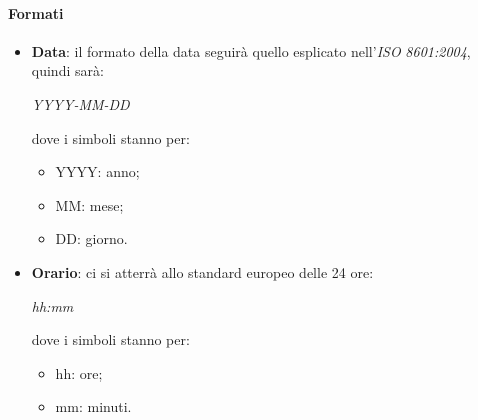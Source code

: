 	\paragraph{Formati}
	\begin{itemize}
	\item \textbf{Data}: il formato della data seguirà quello esplicato nell'\emph{ISO} \emph{8601:2004}, quindi sarà: 
		\begin{center}
			\emph{YYYY-MM-DD}
		\end{center}
	dove i simboli stanno per:
		\begin{itemize}
			\item YYYY: anno;
			\item MM: mese;
			\item DD: giorno.
		\end{itemize}
	\item \textbf{Orario}: ci si atterrà allo standard europeo delle 24 ore:
		 \begin{center}
		 	\emph{hh:mm}
		 \end{center}
	dove i simboli stanno per:
	 	\begin{itemize}
	 		\item hh: ore;
	 		\item mm: minuti.
	 	\end{itemize}
 	\begin{comment}
		\item \textbf{Nome del documento}: \textcolor{red}{Dovremmo elaborare un comando che, una volta invocato, genera automaticamente il nome del documento e la sua versione}
		\item \textbf{Nome del gruppo}: per riferirsi al nome del gruppo si dovrà
		utilizzare il comando garantendo in questo modo la corretta sintassi;
		\item \textbf{Nome del progetto}: per iferirsi al nome del progetto si dovrà
		utilizzare il comando garantendo in questo modo la corretta sintassi;
		\item \textbf{Link sito del gruppo}: per riferirsi al link del sito del gruppo si dovrà
		utilizzare il comando garantendo in questo modo la corretta sintassi;
		\item \textbf{Email del gruppo}: per riferirsi all'indirizzo email del gruppo si dovrà
		utilizzare il comando garantendo in questo modo la corretta sintassi;
		\item \textbf{Nome del proponente}: per riferirsi al nome del proponente, ovvero del proponente, si dovrà
		utilizzare il comando garantendo in questo modo la corretta
		sintassi.
	\end{comment}
	
	\end{itemize}
